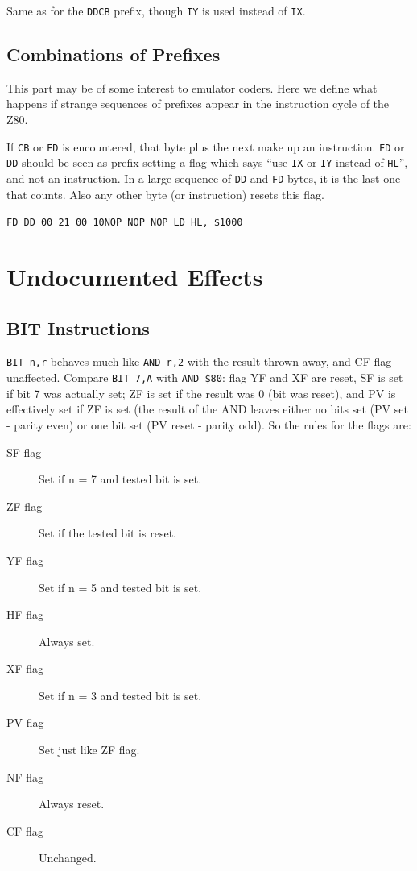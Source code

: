 Same as for the {\tt DDCB} prefix, though {\tt IY} is used instead of {\tt IX}.


\subsection{Combinations of Prefixes}

This part may be of some interest to emulator coders. Here we define what happens if strange sequences of prefixes appear in the instruction cycle of the Z80.

If {\tt CB} or {\tt ED} is encountered, that byte plus the next make up an instruction. {\tt FD} or {\tt DD} should be seen as prefix setting a flag which says ``use {\tt IX} or {\tt IY} instead of {\tt HL}'', and not an instruction. In a large sequence of {\tt DD} and {\tt FD} bytes, it is the last one that counts. Also any other byte (or instruction) resets this flag.

{\tt {\qquad}FD DD 00 21 00 10{\qquad}NOP NOP NOP LD HL, \$1000}




\section{Undocumented Effects}

\subsection{BIT Instructions}
\label{z80_undocumented_flags_bit}

{\tt BIT n,r} behaves much like {\tt AND r,2{}} with the result thrown away, and CF flag unaffected. Compare {\tt BIT 7,A} with {\tt AND \$80}: flag YF and XF are reset, SF is set if bit 7 was actually set; ZF is set if the result was 0 (bit was reset), and PV is effectively set if ZF is set (the result of the AND leaves either no bits set (PV set - parity even) or one bit set (PV reset - parity odd). So the rules for the flags are:

\begin{description}
	\item[SF flag]
	Set if n = 7 and tested bit is set.

	\item[ZF flag]
	Set if the tested bit is reset.

	\item[YF flag]
	Set if n = 5 and tested bit is set.

	\item[HF flag]
	Always set.

	\item[XF flag]
	Set if n = 3 and tested bit is set.

	\item[PV flag]
	Set just like ZF flag.

	\item[NF flag]
	Always reset. 

	\item[CF flag]
	Unchanged.

\end{description}

